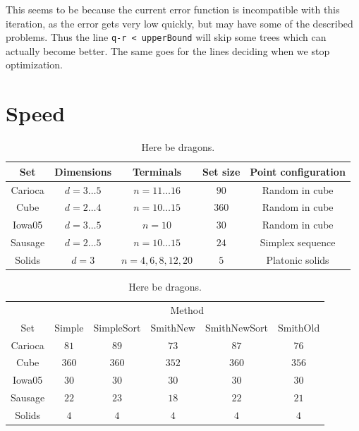 This seems to be because the current error function is incompatible with this
iteration, as the error gets very low quickly, but may have some of the
described problems. Thus the line \texttt{q-r < upperBound} will skip some trees
which can actually become better. The same goes for the lines deciding when we
stop optimization.

\section{Speed}
\label{sec:speed}

\begin{table}[htbp]
  \centering
  \begin{tabular}{ccccc}
    \toprule
    Set     & Dimensions       & Terminals             & Set size & Point configuration \\
    \midrule
    Carioca & $d = 3 \ldots 5$ & $n = 11 \ldots 16$    & $90$       & Random in cube      \\
    Cube    & $d = 2 \ldots 4$ & $n = 10 \ldots 15$    & $360$      & Random in cube      \\
    Iowa05  & $d = 3 \ldots 5$ & $n = 10$              & $30$       & Random in cube      \\
    Sausage & $d = 2 \ldots 5$ & $n = 10 \ldots 15$    & $24$       & Simplex sequence    \\
    Solids  & $d = 3$          & $n = 4, 6, 8, 12, 20$ & $5$        & Platonic solids     \\
    \bottomrule
  \end{tabular}
  \caption[Here be dragons]{Here be dragons.\label{tab:test-sets}}
\end{table}

\begin{table}[htbp]
  \centering
  \begin{tabular}{cccccc}
    \toprule
            & \multicolumn{5}{c}{Method}                               \\
    \cmidrule(l){2-6}
    Set     & Simple & SimpleSort & SmithNew & SmithNewSort & SmithOld \\
    \cmidrule(r){1-1}\cmidrule(l){2-6}
    Carioca & $81$   & $89$       & $73$     & $87$         & $76$     \\
    Cube    & $360$  & $360$      & $352$    & $360$        & $356$    \\
    Iowa05  & $30$   & $30$       & $30$     & $30$         & $30$     \\
    Sausage & $22$   & $23$       & $18$     & $22$         & $21$     \\
    Solids  & $4$    & $4$        & $4$      & $4$          & $4$      \\
    \bottomrule
  \end{tabular}
  \caption[Here be dragons]{Here be dragons.\label{tab:set-success}}
\end{table}

